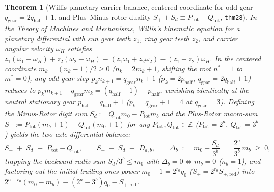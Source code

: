 \documentclass[11pt,a4paper]{article}
\newtheorem{theorem}{Theorem}[section]
\theoremstyle{definition}
\theoremstyle{remark}
\begin{document}
\begin{theorem}[Willis planetary carrier balance, centered coordinate for odd gear $q_{\mathrm{gear}}=2q_{\mathrm{half}}+1$, and Plus--Minus rotor duality $S_+ + S_d \equiv P_{\mathrm{tot}} - Q_{\mathrm{tot}}$, \texttt{thm28}]
\label{thm:plus-minus-rotor-duality}
In the Theory of Machines and Mechanisms, Willis's kinematic equation for a planetary differential with sun gear teeth $z_1$, ring gear teeth $z_2$, and carrier angular velocity $\omega_H$ satisfies $z_1(\omega_1 - \omega_H) + z_2(\omega_2 - \omega_H) \equiv (z_1\omega_1 + z_2\omega_2) - (z_1+z_2)\omega_H$. In the centered coordinate $m_k = (n_k - 1)/2 \ge 0$ ($n_k = 2 m_k + 1$, shifting the root $n^* = 1$ to $m^* = 0$), any odd gear step $p_k n_{k+1} = q_{\mathrm{gear}} n_k + 1$ ($p_k = 2p_{\mathrm{half}},\ q_{\mathrm{gear}} = 2q_{\mathrm{half}}+1$) reduces to $p_k m_{k+1} - q_{\mathrm{gear}} m_k = (q_{\mathrm{half}}+1) - p_{\mathrm{half}}$, vanishing identically at the neutral stationary gear $p_{\mathrm{half}} = q_{\mathrm{half}}+1$ ($p_k = q_{\mathrm{gear}}+1 = 4$ at $q_{\mathrm{gear}}=3$). Defining the Minus-Rotor digit sum $S_d := Q_{\mathrm{tot}} m_0 - P_{\mathrm{tot}} m_b$ and the Plus-Rotor macro-sum $S_+ := P_{\mathrm{tot}}(m_b + 1) - Q_{\mathrm{tot}}(m_0 + 1)$ for any $P_{\mathrm{tot}},Q_{\mathrm{tot}}\in\mathbb{Z}$ ($P_{\mathrm{tot}}=2^a,\ Q_{\mathrm{tot}}=3^b$) yields the two-axle differential balance:
\begin{equation}
  \label{eq:plus-minus-rotor-duality}
  S_+ \;+\; S_d \;\equiv\; P_{\mathrm{tot}} - Q_{\mathrm{tot}}, \qquad
  S_+ \;-\; S_d \;\equiv\; D_{a,b}, \qquad
  \Delta_b \;:=\; m_0 - \frac{S_d}{3^b} \;=\; \frac{2^a}{3^b}\,m_b \;\ge\; 0,
\end{equation}
trapping the backward radix sum $S_d/3^b \le m_0$ with $\Delta_b = 0 \iff m_b = 0$ ($n_b = 1$), and factoring out the initial trailing-ones power $m_0 + 1 = 2^{r_0} q_0$ ($S_+ = 2^{r_0} S_{+,\mathrm{red}}$) into $2^{a - r_0}(m_0 - m_b) \equiv (2^a - 3^b) q_0 - S_{+,\mathrm{red}}$.
\end{theorem}
\end{document}
